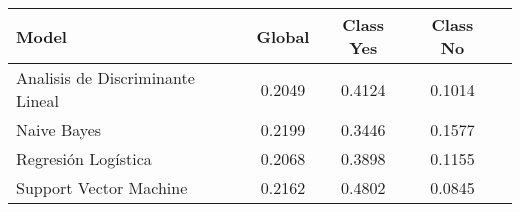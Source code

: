 \begin{tabular}{p{3cm}|c|c|c|c}
\toprule
                            Model &  Global &  Class Yes &  Class No \\
\midrule
 Analisis de Discriminante Lineal &  0.2049 &     0.4124 &    0.1014 \\
                      Naive Bayes &  0.2199 &     0.3446 &    0.1577 \\
              Regresión Logística &  0.2068 &     0.3898 &    0.1155 \\
           Support Vector Machine &  0.2162 &     0.4802 &    0.0845 \\
\bottomrule
\end{tabular}

